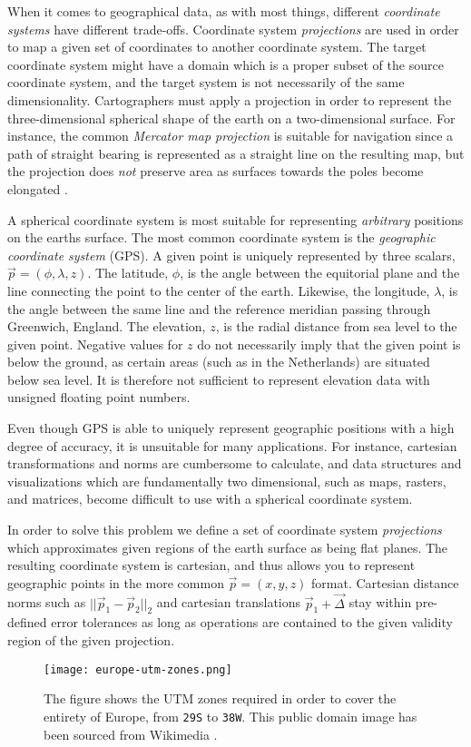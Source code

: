 When it comes to geographical data, as with most things, different \textit{coordinate systems} have different trade-offs.
Coordinate system \textit{projections} are used in order to map a given set of coordinates to another coordinate system.
The target coordinate system might have a domain which is a proper subset of the source coordinate system, and the target system is not necessarily of the same dimensionality.
Cartographers must apply a projection in order to represent the three-dimensional spherical shape of the earth on a two-dimensional surface.
For instance, the common \textit{Mercator map projection} is suitable for navigation since a path of straight bearing is represented as a straight line on the resulting map, but the projection does \textit{not} preserve area as surfaces towards the poles become elongated \cite[p.~38]{map_projections_1987}.

A spherical coordinate system is most suitable for representing \textit{arbitrary} positions on the earths surface.
The most common coordinate system is the \textit{geographic coordinate system} (GPS).
A given point is uniquely represented by three scalars, $\vec{p} = (\phi, \lambda, z)$.
The latitude, $\phi$, is the angle between the equitorial plane and the line connecting the point to the center of the earth.
Likewise, the longitude, $\lambda$, is the angle between the same line and the reference meridian passing through Greenwich, England.
The elevation, $z$, is the radial distance from sea level to the given point.
Negative values for $z$ do not necessarily imply that the given point is below the ground, as certain areas (such as in the Netherlands) are situated below sea level.
It is therefore not sufficient to represent elevation data with unsigned floating point numbers.

Even though GPS is able to uniquely represent geographic positions with a high degree of accuracy, it is unsuitable for many applications.
For instance, cartesian transformations and norms are cumbersome to calculate, and data structures and visualizations which are fundamentally two dimensional, such as maps, rasters, and matrices, become difficult to use with a spherical coordinate system.

In order to solve this problem we define a set of coordinate system \textit{projections} which approximates given regions of the earth surface as being flat planes.
The resulting coordinate system is cartesian, and thus allows you to represent geographic points in the more common $\vec{p} = (x, y, z)$ format.
Cartesian distance norms such as $||\vec{p}_1 - \vec{p}_2||_2$ and cartesian translations $\vec{p}_1 + \vec{\Delta}$ stay within pre-defined error tolerances as long as operations are contained to the given validity region of the given projection.

\begin{figure}[H]
  \centering
  \texttt{[image: europe-utm-zones.png]}
  \caption{
    The figure shows the UTM zones required in order to cover the entirety of Europe, from \texttt{29S} to \texttt{38W}.
    This public domain image has been sourced from Wikimedia \cite{wiki:europe_utm_zones}.
  }
\end{figure}
